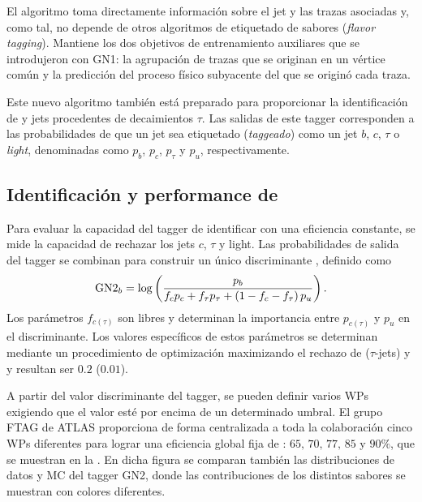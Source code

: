 El algoritmo toma directamente información sobre el jet y las trazas asociadas y, como tal, no depende de otros algoritmos de etiquetado de sabores (\textit{flavor tagging}). Mantiene los dos objetivos de entrenamiento auxiliares que se introdujeron con GN1: la agrupación de trazas que se originan en un vértice común y la predicción del proceso físico subyacente del que se originó cada traza.

Este nuevo algoritmo también está preparado para proporcionar la identificación de \cjets y jets procedentes de decaimientos \(\tau\). Las salidas de este tagger corresponden a las probabilidades de que un jet sea etiquetado (\textit{taggeado}) como un jet \(b\), \(c\), \(\tau\) o \textit{light}, denominadas como \(p_b\), \(p_c\), \(p_{\tau}\) y \(p_u\), respectivamente.

\subsection{Identificación y performance de \btagging}

Para evaluar la capacidad del tagger de identificar \bjets con una eficiencia constante, se mide la capacidad de rechazar los jets \(c\), \(\tau\) y light. Las probabilidades de salida del tagger se combinan para construir un único discriminante \gntb, definido como
\begin{equation}
    \text{GN2}_{b} = \log \left(
        \frac{p_b}{f_c p_c + f_{\tau} p_{\tau} + \left(1-f_c-f_{\tau}\right)p_u}
    \right).
\end{equation}
Los parámetros \(f_{c(\tau)}\) son libres y determinan la importancia entre \(p_{c(\tau)}\) y \(p_u\) en el discriminante. Los valores específicos de estos parámetros se determinan mediante un procedimiento de optimización maximizando el rechazo de \cjets (\(\tau\)-jets) y \ljets y resultan ser \(0.2\) (\(0.01\)).


A partir del valor discriminante del tagger, se pueden definir varios \acp{WP} exigiendo que el valor \gntb esté por encima de un determinado umbral. El grupo \ac{FTAG} de \ac{ATLAS} proporciona de forma centralizada a toda la colaboración cinco \acp{WP} diferentes para lograr una eficiencia global fija de \btagging: \(65,\, 70,\, 77,\, 85\) y \(90\%\), que se muestran en la \Fig{\ref{fig:objects:jet_tagging:btag_discrminant}}. En dicha figura se comparan también las distribuciones de datos y \ac{MC} del tagger GN2, donde las contribuciones de los distintos sabores se muestran con colores diferentes.

